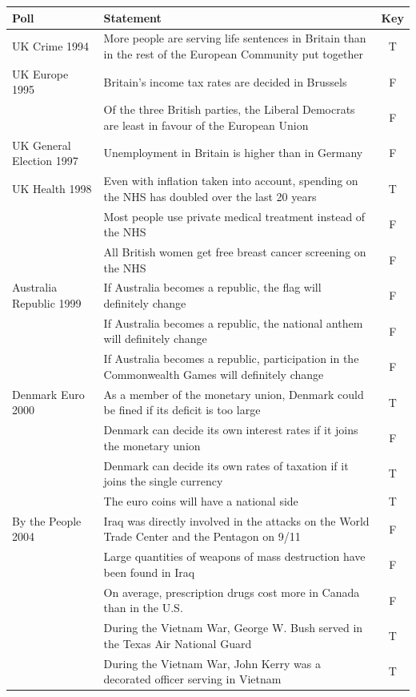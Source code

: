 \begingroup
\small
\setlength{\tabcolsep}{6pt}
\renewcommand{\arraystretch}{1}
\begin{tabular}{lp{10cm}c}
\toprule
Poll & Statement & Key \\
\midrule
UK Crime 1994 & More people are serving life sentences in Britain than in the rest of the European Community put together & T \\
UK Europe 1995 & Britain's income tax rates are decided in Brussels & F \\
 & Of the three British parties, the Liberal Democrats are least in favour of the European Union & F \\
UK General Election 1997 & Unemployment in Britain is higher than in Germany & F \\
UK Health 1998 & Even with inflation taken into account, spending on the NHS has doubled over the last 20 years & T \\
 & Most people use private medical treatment instead of the NHS & F \\
 & All British women get free breast cancer screening on the NHS & F \\
Australia Republic 1999 & If Australia becomes a republic, the flag will definitely change & F \\
 & If Australia becomes a republic, the national anthem will definitely change & F \\
 & If Australia becomes a republic, participation in the Commonwealth Games will definitely change & F \\
Denmark Euro 2000 & As a member of the monetary union, Denmark could be fined if its deficit is too large & T \\
 & Denmark can decide its own interest rates if it joins the monetary union & F \\
 & Denmark can decide its own rates of taxation if it joins the single currency & T \\
 & The euro coins will have a national side & T \\
By the People 2004 & Iraq was directly involved in the attacks on the World Trade Center and the Pentagon on 9/11 & F \\
 & Large quantities of weapons of mass destruction have been found in Iraq & F \\
 & On average, prescription drugs cost more in Canada than in the U.S. & F \\
 & During the Vietnam War, George W. Bush served in the Texas Air National Guard & T \\
 & During the Vietnam War, John Kerry was a decorated officer serving in Vietnam & T \\
\bottomrule
\end{tabular}
\endgroup
